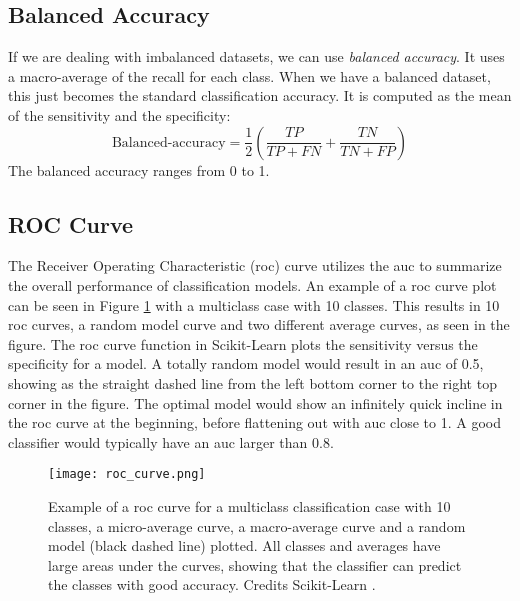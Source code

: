 \documentclass[a4paper, american, 12pt]{report}
\begin{document}
	
	\subsection{Balanced Accuracy}
	\label{subsect:Theory-BalancedAcc}
	If we are dealing with imbalanced datasets, we can use \textit{balanced accuracy}. It uses a macro-average of the recall for each class. When we have a balanced dataset, this just becomes the standard classification accuracy. It is computed as the mean of the sensitivity and the specificity:
	\begin{equation}
	\label{eq:BalancedAcc}
		\text{Balanced-accuracy}=\frac{1}{2}\left(\frac{TP}{TP+FN}+\frac{TN}{TN+FP}\right)
	\end{equation}
	The balanced accuracy ranges from 0 to 1.
		
	
	\subsection{ROC Curve}
	\label{subsect:Theory-ROC}
	The Receiver Operating Characteristic (\acrshort{roc}) curve utilizes the \acrshort{auc} to summarize the overall performance of classification models. An example of a \acrshort{roc} curve plot can be seen in Figure \ref{fig:ROC} with a multiclass case with 10 classes. This results in 10 \acrshort{roc} curves, a random model curve and two different average curves, as seen in the figure. The \acrshort{roc} curve function in Scikit-Learn plots the sensitivity versus the specificity for a model. A totally random model would result in an \acrshort{auc} of 0.5, showing as the straight dashed line from the left bottom corner to the right top corner in the figure. The optimal model would show an infinitely quick incline in the \acrshort{roc} curve at the beginning, before flattening out with \acrshort{auc} close to 1. A good classifier would typically have an \acrshort{auc} larger than 0.8.
	\begin{figure}[htb!]
		\hspace*{-1.0cm}
		\centering\texttt{[image: roc\_curve.png]}
		\caption[ROC Curve.]{Example of a \acrshort{roc} curve for a multiclass classification case with 10 classes, a micro-average curve, a macro-average curve and a random model (black dashed line) plotted. All classes and averages have large areas under the curves, showing that the classifier can predict the classes with good accuracy. Credits Scikit-Learn \cite{scikit-learn}. \label{fig:ROC}}
	\end{figure}
	
\end{document}

